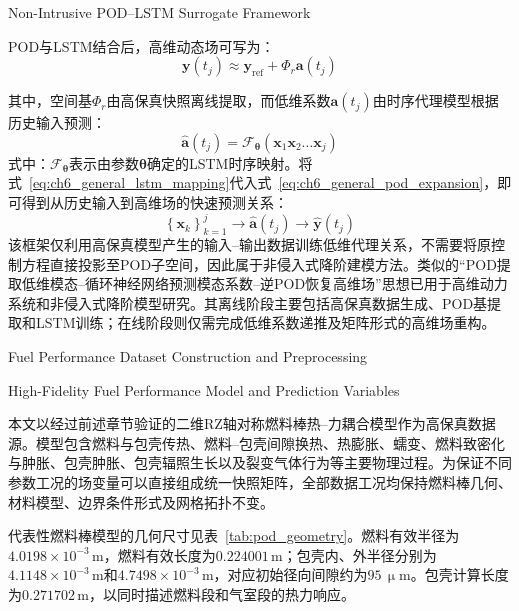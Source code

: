 {Non-Intrusive POD--LSTM Surrogate Framework}
\label{subsec:ch6_pod_lstm_framework}

POD与LSTM结合后，高维动态场可写为：
\begin{equation}
	\boldsymbol y(t_j)
	\approx
	\boldsymbol y_{\mathrm{ref}}
	+
	\boldsymbol\varPhi_r\boldsymbol a(t_j)
	\label{eq:ch6_general_pod_expansion}
\end{equation}

其中，空间基$\boldsymbol\varPhi_r$由高保真快照离线提取，而低维系数$\boldsymbol a(t_j)$由时序代理模型根据历史输入预测：
\begin{equation}
	\widehat{\boldsymbol a}(t_j)
	=
	\mathcal F_{\boldsymbol\theta}
	\left(
	\boldsymbol x_1
	\boldsymbol x_2
	\ldots
	\boldsymbol x_j
	\right)
	\label{eq:ch6_general_lstm_mapping}
\end{equation}
\noindent 式中：$\mathcal F_{\boldsymbol\theta}$表示由参数$\boldsymbol\theta$确定的LSTM时序映射。将式~\eqref{eq:ch6_general_lstm_mapping}代入式~\eqref{eq:ch6_general_pod_expansion}，即可得到从历史输入到高维场的快速预测关系：
\begin{equation}
	\left\{\boldsymbol x_k\right\}_{k=1}^{j}
	\longrightarrow
	\widehat{\boldsymbol a}(t_j)
	\longrightarrow
	\widehat{\boldsymbol y}(t_j)
	\label{eq:ch6_general_pod_lstm_chain}
\end{equation}
该框架仅利用高保真模型产生的输入--输出数据训练低维代理关系，不需要将原控制方程直接投影至POD子空间，因此属于非侵入式降阶建模方法。类似的“POD提取低维模态--循环神经网络预测模态系数--逆POD恢复高维场”思想已用于高维动力系统和非侵入式降阶模型研究\cite{vlachasDataDrivenForecasting2018,rahmanNonintrusiveReducedOrder2019}。其离线阶段主要包括高保真数据生成、POD基提取和LSTM训练；在线阶段则仅需完成低维系数递推及矩阵形式的高维场重构。

{Fuel Performance Dataset Construction and Preprocessing}
\label{sec:ch6_dataset}

{High-Fidelity Fuel Performance Model and Prediction Variables}

本文以经过前述章节验证的二维RZ轴对称燃料棒热--力耦合模型作为高保真数据源。模型包含燃料与包壳传热、燃料--包壳间隙换热、热膨胀、蠕变、燃料致密化与肿胀、包壳肿胀、包壳辐照生长以及裂变气体行为等主要物理过程。为保证不同参数工况的场变量可以直接组成统一快照矩阵，全部数据工况均保持燃料棒几何、材料模型、边界条件形式及网格拓扑不变。

代表性燃料棒模型的几何尺寸见表~\ref{tab:pod_geometry}。燃料有效半径为$4.0198\times10^{-3}\,\mathrm{m}$，燃料有效长度为$0.224001\,\mathrm{m}$；包壳内、外半径分别为$4.1148\times10^{-3}\,\mathrm{m}$和$4.7498\times10^{-3}\,\mathrm{m}$，对应初始径向间隙约为$95\,\upmu\mathrm{m}$。包壳计算长度为$0.271702\,\mathrm{m}$，以同时描述燃料段和气室段的热力响应。

